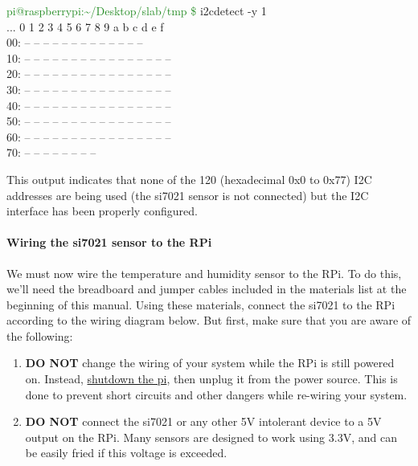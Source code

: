 \documentclass{article}
\newcommand*{\myfont}{\fontfamily{pcr}\selectfont}
\newcommand{\outputb}[2]{
  \begin{tcolorbox}[width=\textwidth,colback={light-gray},title={#1},colbacktitle=gray,coltitle=light-gray]
    \myfont
    #2
  \end{tcolorbox}
} %
\begin{document}
    \outputb{I2C interface detection output (si7021 \textbf{NOT} wired)}
    {
      \textcolor{ForestGreen}{pi@raspberrypi:\textasciitilde/Desktop/slab/tmp \$} i2cdetect -y 1 \\
    ...       0  1  2  3  4  5  6  7  8  9  a  b  c  d  e  f \\
      00:          -- -- -- -- -- -- -- -- -- -- -- -- -- \\
      10: -- -- -- -- -- -- -- -- -- -- -- -- -- -- -- -- \\
      20: -- -- -- -- -- -- -- -- -- -- -- -- -- -- -- -- \\
      30: -- -- -- -- -- -- -- -- -- -- -- -- -- -- -- -- \\
      40: -- -- -- -- -- -- -- -- -- -- -- -- -- -- -- -- \\
      50: -- -- -- -- -- -- -- -- -- -- -- -- -- -- -- -- \\
      60: -- -- -- -- -- -- -- -- -- -- -- -- -- -- -- -- \\
      70: -- -- -- -- -- -- -- --
    }

    This output indicates that none of the 120 (hexadecimal 0x0 to 0x77) I2C addresses are being used (the si7021 sensor is not connected) but the I2C interface has been properly configured.

  \paragraph{Wiring the si7021 sensor to the RPi}
  We must now wire the temperature and humidity sensor to the RPi. To do this, we'll need the breadboard and jumper cables included in the materials list at the beginning of this manual. Using these materials, connect the si7021 to the RPi according to the wiring diagram below. But first, make sure that you are aware of the following:
  \begin{enumerate}
    \item \textbf{DO NOT} change the wiring of your system while the RPi is still powered on. Instead, \hyperref[sec:shutting-down]{shutdown the pi}, then unplug it from the power source. This is done to prevent short circuits and other dangers while re-wiring your system.
    \item \textbf{DO NOT} connect the si7021 or any other 5V intolerant device to a 5V output on the RPi. Many sensors are designed to work using 3.3V, and can be easily fried if this voltage is exceeded.
  \end{enumerate}
\end{document}

